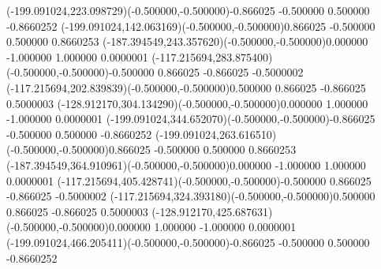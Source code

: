 \fontsize{12.000000}{14.400000}\selectfont
\ASYalignT(-199.091024,223.098729)(-0.500000,-0.500000){-0.866025 -0.500000 0.500000 -0.866025}{2}%
\color{ASYcolor}
\fontsize{12.000000}{14.400000}\selectfont
\ASYalignT(-199.091024,142.063169)(-0.500000,-0.500000){0.866025 -0.500000 0.500000 0.866025}{3}%
\color{ASYcolor}
\fontsize{12.000000}{14.400000}\selectfont
\ASYalignT(-187.394549,243.357620)(-0.500000,-0.500000){0.000000 -1.000000 1.000000 0.000000}{1}%
\color{ASYcolor}
\fontsize{12.000000}{14.400000}\selectfont
\ASYalignT(-117.215694,283.875400)(-0.500000,-0.500000){-0.500000 0.866025 -0.866025 -0.500000}{2}%
\color{ASYcolor}
\fontsize{12.000000}{14.400000}\selectfont
\ASYalignT(-117.215694,202.839839)(-0.500000,-0.500000){0.500000 0.866025 -0.866025 0.500000}{3}%
\color{ASYcolor}
\fontsize{12.000000}{14.400000}\selectfont
\ASYalignT(-128.912170,304.134290)(-0.500000,-0.500000){0.000000 1.000000 -1.000000 0.000000}{1}%
\color{ASYcolor}
\fontsize{12.000000}{14.400000}\selectfont
\ASYalignT(-199.091024,344.652070)(-0.500000,-0.500000){-0.866025 -0.500000 0.500000 -0.866025}{2}%
\color{ASYcolor}
\fontsize{12.000000}{14.400000}\selectfont
\ASYalignT(-199.091024,263.616510)(-0.500000,-0.500000){0.866025 -0.500000 0.500000 0.866025}{3}%
\color{ASYcolor}
\fontsize{12.000000}{14.400000}\selectfont
\ASYalignT(-187.394549,364.910961)(-0.500000,-0.500000){0.000000 -1.000000 1.000000 0.000000}{1}%
\color{ASYcolor}
\fontsize{12.000000}{14.400000}\selectfont
\ASYalignT(-117.215694,405.428741)(-0.500000,-0.500000){-0.500000 0.866025 -0.866025 -0.500000}{2}%
\color{ASYcolor}
\fontsize{12.000000}{14.400000}\selectfont
\ASYalignT(-117.215694,324.393180)(-0.500000,-0.500000){0.500000 0.866025 -0.866025 0.500000}{3}%
\color{ASYcolor}
\fontsize{12.000000}{14.400000}\selectfont
\ASYalignT(-128.912170,425.687631)(-0.500000,-0.500000){0.000000 1.000000 -1.000000 0.000000}{1}%
\color{ASYcolor}
\fontsize{12.000000}{14.400000}\selectfont
\ASYalignT(-199.091024,466.205411)(-0.500000,-0.500000){-0.866025 -0.500000 0.500000 -0.866025}{2}%
\color{ASYcolor}
\fontsize{12.000000}{14.400000}\selectfont
